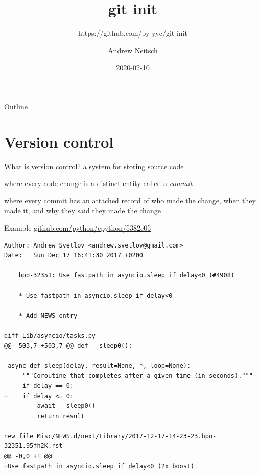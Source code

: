 \documentclass[xcolor=svgnames,17pt]{beamer}
\title{git init}
\subtitle{https://github.com/py-yyc/git-init}
\author{\texorpdfstring{%
    Andrew Neitsch}{Andrew Neitsch}}
\date{\small 2020-02-10}
\newcommand*{\sizefont}[1]{%
    \ifcase#1\relax
    \or \tiny
    \or \scriptsize
    \or \footnotesize
    \or \small
    \or \normalsize
    \or \large
    \or \Large
    \or \LARGE
    \or \huge
    \or \Huge
    \fi}
\newcommand*{\tocsection}[1]{\pdfbookmark[2]{#1}{#1}}
\begin{document}
\tocsection{Title page}

\sizefont{4}

\begin{frame}[plain]
\titlepage
\end{frame}

\begin{frame}{Outline}
\tableofcontents
\end{frame}

\section{Version control}

\def\fillinblank{\_\_\_\_}

\begin{frame}{What is version control?}
a system for storing source code
\\[\baselineskip] \pause

where every code change is a distinct entity called a \textit{commit}
\\[\baselineskip] \pause

where every commit has an attached record of who made the change, when they
made it, and why they said they made the change
\end{frame}

\begin{frame}[fragile]{Example}
\href{https://github.com/python/cpython/commit/5382c05021026fe623def829d121f5f6af4909fb}{github.com/python/cpython/5382c05}

\sizefont{1}
\begin{verbatim}
Author: Andrew Svetlov <andrew.svetlov@gmail.com>
Date:   Sun Dec 17 16:41:30 2017 +0200

    bpo-32351: Use fastpath in asyncio.sleep if delay<0 (#4908)
    
    * Use fastpath in asyncio.sleep if delay<0
    
    * Add NEWS entry

diff Lib/asyncio/tasks.py
@@ -503,7 +503,7 @@ def __sleep0():
 
 async def sleep(delay, result=None, *, loop=None):
     """Coroutine that completes after a given time (in seconds)."""
-    if delay == 0:
+    if delay <= 0:
         await __sleep0()
         return result
 
new file Misc/NEWS.d/next/Library/2017-12-17-14-23-23.bpo-32351.95fh2K.rst
@@ -0,0 +1 @@
+Use fastpath in asyncio.sleep if delay<0 (2x boost)

\end{verbatim}
\end{frame}
\end{document}
